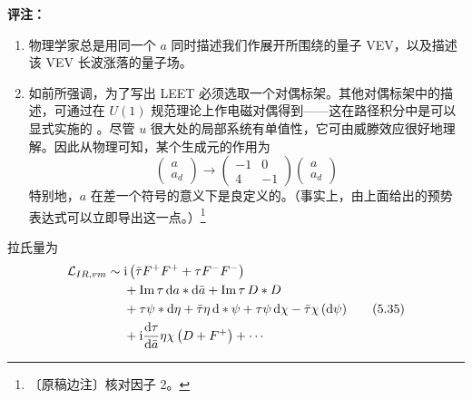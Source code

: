 \medskip
\noindent\textbf{评注：}
\begin{enumerate}[label=\arabic*., leftmargin=2.1em]
\item 物理学家总是用同一个 $a$ 同时描述我们作展开所围绕的量子 VEV，以及描述该 VEV 长波涨落的量子场。
\item 如前所强调，为了写出 LEET 必须选取一个对偶标架。其他对偶标架中的描述，可通过在 $U(1)$ 规范理论上作电磁对偶得到——这在路径积分中是可以显式实施的 \cite{ref46,ref56}。尽管 $u$ 很大处的局部系统有单值性，它可由威滕效应很好地理解。因此从物理可知，某个生成元的作用为
\begin{equation}
\begin{pmatrix}
a\\
a_{d}
\end{pmatrix}
\to
\begin{pmatrix}
-1 & 0\\
4 & -1
\end{pmatrix}
\begin{pmatrix}
a\\
a_{d}
\end{pmatrix}
\tag{5.34}
\end{equation}
特别地，$a$ 在差一个符号的意义下是良定义的。（事实上，由上面给出的预势表达式可以立即导出这一点。）\footnote{〔原稿边注〕核对因子 2。}
\end{enumerate}

拉氏量为
\begin{align}
\mathcal{L}_{IR,vm}\sim{}&
\mathrm{i}\left(\bar\tau F^{+}F^{+}+\tau F^{-}F^{-}\right)\notag\\
&+\mathrm{Im}\,\tau\,\mathrm{d} a\ast \mathrm{d}\bar a+\mathrm{Im}\,\tau\,D\ast D\notag\\
&+\tau\psi\ast \mathrm{d}\eta+\bar\tau\eta\,\mathrm{d}\ast\psi+\tau\psi\,\mathrm{d}\chi-\bar\tau\chi\,(\mathrm{d}\psi)
\tag{5.35}\\
&+\mathrm{i}\frac{\mathrm{d}\tau}{\mathrm{d}\bar a}\eta\chi\left(D+F^{+}\right)+\cdots\notag
\end{align}


